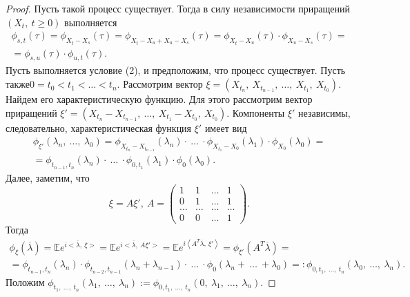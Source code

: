 \begin{proof}
Пусть такой процесс существует. Тогда в силу независимости приращений $\displaystyle ( X_{t} ,\ t\geqslant 0)$ выполняется
\begin{gather*}
\phi _{s,t}( \tau ) =\phi _{X_{t} -X_{s}}( \tau ) =\phi _{X_{t} -X_{u} +X_{u} -X_{s}}( \tau ) =\phi _{X_{t} -X_{u}}( \tau ) \cdotp \phi _{X_{u} -X_{s}}( \tau ) =\\
=\phi _{s,u}( \tau ) \cdotp \phi _{u,t}( \tau ) .
\end{gather*}
Пусть выполняется условие (2), и предположим, что процесс существует. Пусть также$\displaystyle 0=t_{0} < t_{1} < \dotsc < t_{n}$. Рассмотрим вектор $\displaystyle \xi =( X_{t_{n}} ,\ X_{t_{n-1}} ,\ \dotsc ,\ X_{t_{1}} ,\ X_{t_{0}})$. Найдем его характеристическую функцию. Для этого рассмотрим вектор приращений $\displaystyle \xi '=( X_{t_{n}} -X_{t_{n-1}} ,\ \dotsc ,\ X_{t_{1}} -X_{t_{0}} ,\ X_{t_{0}})$. Компоненты $\displaystyle \xi '$ независимы, следовательно, характеристическая функция $\displaystyle \xi '$ имеет вид
\begin{gather*}
\phi _{\xi '}( \lambda _{n} ,\ \dotsc ,\ \lambda _{0}) =\phi _{X_{t_{n}} -X_{t_{n-1}}}( \lambda _{n}) \cdotp \ \dotsc \ \cdotp \phi _{X_{t_{1}} -X_{0}}( \lambda _{1}) \cdotp \phi _{X_{0}}( \lambda _{0}) =\\
=\phi _{t_{n-1} ,t_{n}}( \lambda _{n}) \cdotp \ \dotsc \ \cdotp \phi _{0,t_{1}}( \lambda _{1}) \cdotp \phi _{0}( \lambda _{0}) .
\end{gather*}
Далее, заметим, что
\begin{equation*}
\xi =A\xi ',\ A=\begin{pmatrix}
1 & 1 & \dotsc  & 1\\
0 & 1 & \dotsc  & 1\\
\dotsc  & \dotsc  & \dotsc  & \dotsc \\
0 & 0 & \dotsc  & 1
\end{pmatrix} .
\end{equation*}
Тогда
\begin{gather*}
\phi _{\xi }(\overline{\lambda }) =\mathbb{E} e^{i< \overline{\lambda } ,\ \xi > } =\mathbb{E} e^{i< \overline{\lambda } ,\ A\xi '> } =\mathbb{E} e^{i\left< A^{T}\overline{\lambda } ,\ \xi '\right> } =\phi _{\xi '}\left( A^{T}\overline{\lambda }\right) =\\
=\phi _{t_{n-1} ,t_{n}}( \lambda _{n}) \cdotp \phi _{t_{n-2} ,t_{n-1}}( \lambda _{n} +\lambda _{n-1}) \cdotp \ \dotsc \ \cdotp \phi _{0}( \lambda _{n} +\ \dotsc \ +\lambda _{0}) =:\phi _{0,t_{1} ,\ \dotsc ,\ t_{n}}( \lambda _{0} ,\ \dotsc ,\ \lambda _{n}) .
\end{gather*}
Положим $\displaystyle \phi _{t_{1} ,\ \dotsc ,\ t_{n}}( \lambda _{1} ,\ \dotsc ,\ \lambda _{n}) :=\phi _{0,t_{1} ,\ \dotsc ,\ t_{n}}( 0,\ \lambda _{1} ,\ \dotsc ,\ \lambda _{n})$.


\end{proof}
